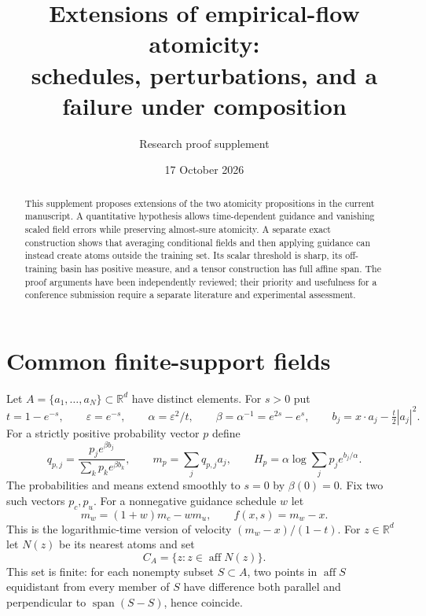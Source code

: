 \documentclass[11pt]{article}
\title{Extensions of empirical-flow atomicity:\\ schedules, perturbations, and a failure under composition}
\author{Research proof supplement}
\date{17 October 2026}
\newcommand{\R}{\mathbb R}
\newcommand{\eps}{\varepsilon}
\newcommand{\aff}{\operatorname{aff}}
\begin{document}
\maketitle
\begin{abstract}
This supplement proposes extensions of the two atomicity propositions in the
current manuscript. A quantitative hypothesis allows time-dependent guidance
and vanishing scaled field errors while preserving almost-sure atomicity.
A separate exact construction shows that averaging conditional fields and then
applying guidance can instead create atoms outside the training set. Its scalar
threshold is sharp, its off-training basin has positive measure, and a tensor
construction has full affine span. The proof arguments have been independently
reviewed; their priority and usefulness for a conference
submission require a separate literature and experimental assessment.
\end{abstract}

\section{Common finite-support fields}
Let $A=\{a_1,\ldots,a_N\}\subset\R^d$ have distinct elements. For $s>0$ put
\[
 t=1-e^{-s},\qquad \eps=e^{-s},\qquad
 \alpha=\eps^2/t,\qquad \beta=\alpha^{-1}=e^{2s}-e^s,
 \qquad b_j=x\cdot a_j-\tfrac t2|a_j|^2.
\]
For a strictly positive probability vector $p$ define
\[
 q_{p,j}=\frac{p_j e^{\beta b_j}}{\sum_kp_ke^{\beta b_k}},\qquad
 m_p=\sum_jq_{p,j}a_j,\qquad
 H_p=\alpha\log\sum_jp_je^{b_j/\alpha}.
\]
The probabilities and means extend smoothly to $s=0$ by $\beta(0)=0$.
Fix two such vectors $p_c,p_u$. For a nonnegative guidance schedule $w$ let
\[
 m_w=(1+w)m_c-wm_u,\qquad f(x,s)=m_w-x.
\]
This is the logarithmic-time version of velocity $(m_w-x)/(1-t)$.
For $z\in\R^d$ let $N(z)$ be its nearest atoms and set
\[
 C_A=\{z:z\in\aff N(z)\}.
\]
This set is finite: for each nonempty subset $S\subset A$, two points in
$\aff S$ equidistant from every member of $S$ have difference both parallel
and perpendicular to $\operatorname{span}(S-S)$, hence coincide.

\clearpage
\end{document}
